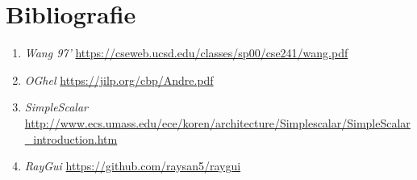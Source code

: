 \section{Bibliografie}

\begin{enumerate}
  \item \textit{Wang 97'} \url{https://cseweb.ucsd.edu/classes/sp00/cse241/wang.pdf}
  \item \textit{OGhel} \url{https://jilp.org/cbp/Andre.pdf}
  \item \textit{SimpleScalar} \url{http://www.ecs.umass.edu/ece/koren/architecture/Simplescalar/SimpleScalar_introduction.htm}
  \item \textit{RayGui} \url{https://github.com/raysan5/raygui}

\end{enumerate}

